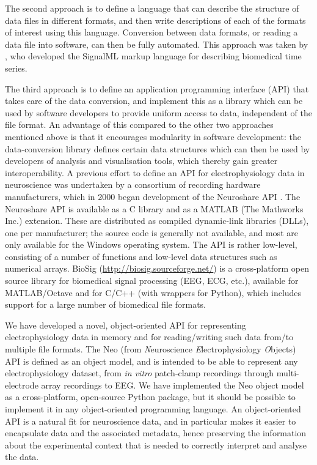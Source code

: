 \documentclass{frontiers}
\newcommand{\latin}[1]{\textit{#1}}
\begin{document}
The second approach is to define a language that can describe the structure of data files in different formats, and then write descriptions of each of the formats of interest using this language.
Conversion between data formats, or reading a data file into software, can then be fully automated.
This approach was taken by \citet{Durka2004}, who developed the SignalML markup language for describing biomedical time series.

The third approach is to define an application programming interface (API) that takes care of the data conversion, and implement this as a library which can be used by software developers to provide uniform access to data, independent of the file format.
An advantage of this compared to the other two approaches mentioned above is that it encourages modularity in software development: the data-conversion library defines certain data structures which can then be used by developers of analysis and visualisation tools, which thereby gain greater interoperability.
A previous effort to define an API for electrophysiology data in neuroscience was undertaken by a consortium of recording hardware manufacturers, which in 2000 began development of the Neuroshare API \citep{neuroshare}.
The Neuroshare API is available as a C library and as a MATLAB (The Mathworks Inc.) extension.
These are distributed as compiled dynamic-link libraries (DLLs), one per manufacturer; the source code is generally not available, and most are only available for the Windows operating system.
The API is rather low-level, consisting of a number of functions and low-level data structures such as numerical arrays. BioSig (\url{http://biosig.sourceforge.net/}) is a cross-platform open source library for biomedical signal processing (EEG, ECG, etc.), available for MATLAB/Octave and for C/C++ (with wrappers for Python), which includes support for a large number of biomedical file formats.

We have developed a novel, object-oriented API for representing electrophysiology data in memory and for reading/writing such data from/to multiple file formats.
The Neo (from \emph{N}euroscience \emph{E}lectrophysiology \emph{O}bjects) API is defined as an object model, and is intended to be able to represent any electrophysiology dataset, from \latin{in vitro} patch-clamp recordings through multi-electrode array recordings to EEG.
We have implemented the Neo object model as a cross-platform, open-source Python package, but it should be possible to implement it in any object-oriented programming language.
An object-oriented API is a natural fit for neuroscience data, and in particular makes it easier to encapsulate data and the associated metadata, hence preserving the information about the experimental context that is needed to correctly interpret and analyse the data.
\end{document}
